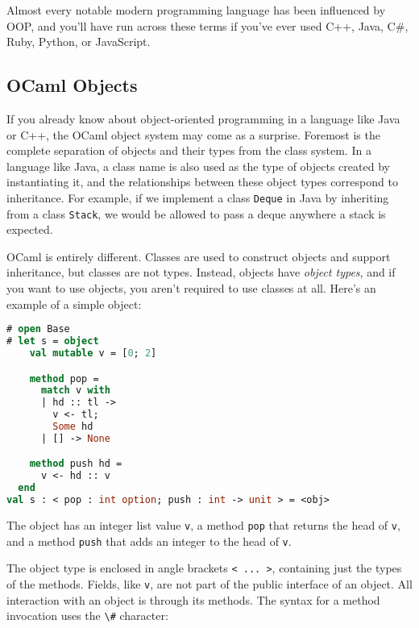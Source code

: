 Almost every notable modern programming language has been influenced by
OOP, and you'll have run across these terms if you've ever used C++,
Java, C\#, Ruby, Python, or JavaScript.

\hypertarget{ocaml-objects}{%
\subsection{OCaml Objects}\label{ocaml-objects}}

If you already know about object-oriented programming in a language like
Java or {C++,} the OCaml object system may come as a surprise. Foremost
is the complete separation of objects and their types from the class
system. In a language like Java, a class name is also used as the type
of objects created by instantiating it, and the relationships between
these object types correspond to inheritance. For example, if we
implement a class \passthrough{\lstinline!Deque!} in Java by inheriting
from a class \passthrough{\lstinline!Stack!}, we would be allowed to
pass a deque anywhere a stack is expected. 

OCaml is entirely different. Classes are used to construct objects and
support inheritance, but classes are not types. Instead, objects have
\emph{object types}, and if you want to use objects, you aren't required
to use classes at all. Here's an example of a simple object:

\begin{lstlisting}[language=Caml]
# open Base
# let s = object
    val mutable v = [0; 2]

    method pop =
      match v with
      | hd :: tl ->
        v <- tl;
        Some hd
      | [] -> None

    method push hd =
      v <- hd :: v
  end
val s : < pop : int option; push : int -> unit > = <obj>
\end{lstlisting}

The object has an integer list value \passthrough{\lstinline!v!}, a
method \passthrough{\lstinline!pop!} that returns the head of
\passthrough{\lstinline!v!}, and a method \passthrough{\lstinline!push!}
that adds an integer to the head of \passthrough{\lstinline!v!}.

The object type is enclosed in angle brackets
\passthrough{\lstinline!< ... >!}, containing just the types of the
methods. Fields, like \passthrough{\lstinline!v!}, are not part of the
public interface of an object. All interaction with an object is through
its methods. The syntax for a method invocation uses the
\passthrough{\lstinline!\#!} character:

